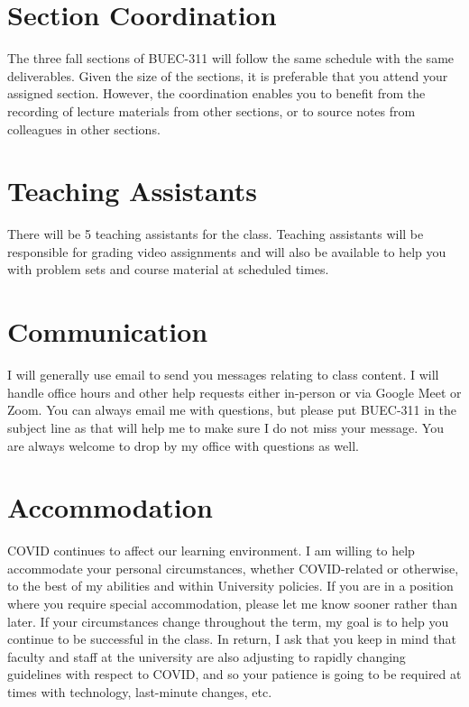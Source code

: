 \documentclass[11pt,]{article}
\begin{document}
\hypertarget{section-coordination}{%
\section{Section Coordination}\label{section-coordination}}

The three fall sections of BUEC-311 will follow the same schedule with
the same deliverables. Given the size of the sections, it is preferable
that you attend your assigned section. However, the coordination enables
you to benefit from the recording of lecture materials from other
sections, or to source notes from colleagues in other sections.

\hypertarget{teaching-assistants}{%
\section{Teaching Assistants}\label{teaching-assistants}}

There will be 5 teaching assistants for the class. Teaching assistants
will be responsible for grading video assignments and will also be
available to help you with problem sets and course material at scheduled
times.

\hypertarget{communication}{%
\section{Communication}\label{communication}}

I will generally use email to send you messages relating to class
content. I will handle office hours and other help requests either
in-person or via Google Meet or Zoom. You can always email me with
questions, but please put BUEC-311 in the subject line as that will help
me to make sure I do not miss your message. You are always welcome to
drop by my office with questions as well.

\hypertarget{accommodation}{%
\section{Accommodation}\label{accommodation}}

COVID continues to affect our learning environment. I am willing to help
accommodate your personal circumstances, whether COVID-related or
otherwise, to the best of my abilities and within University policies.
If you are in a position where you require special accommodation, please
let me know sooner rather than later. If your circumstances change
throughout the term, my goal is to help you continue to be successful in
the class. In return, I ask that you keep in mind that faculty and staff
at the university are also adjusting to rapidly changing guidelines with
respect to COVID, and so your patience is going to be required at times
with technology, last-minute changes, etc.
\end{document}
